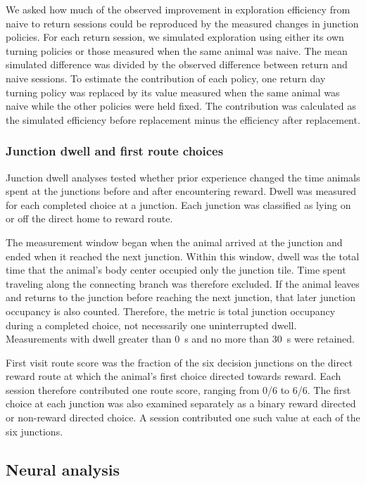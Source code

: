 \documentclass[fleqn,10pt]{wlscirep}
\begin{document}
We asked how much of the observed improvement in exploration efficiency from naive to return sessions could be reproduced by the measured changes in junction policies. For each return session, we simulated exploration using either its own turning policies or those measured when the same animal was naive. The mean simulated difference was divided by the observed difference between return and naive sessions. To estimate the contribution of each policy, one return day turning policy was replaced by its value measured when the same animal was naive while the other policies were held fixed. The contribution was calculated as the simulated efficiency before replacement minus the efficiency after replacement.

\subsubsection*{Junction dwell and first route choices}

Junction dwell analyses tested whether prior experience changed the time animals spent at the junctions before and after encountering reward. Dwell was measured for each completed choice at a junction. Each junction was classified as lying on or off the direct home to reward route.

The measurement window began when the animal arrived at the junction and ended when it reached the next junction. Within this window, dwell was the total time that the animal's body center occupied only the junction tile. Time spent traveling along the connecting branch was therefore excluded. If the animal leaves and returns to the junction before reaching the next junction, that later junction occupancy is also counted. Therefore, the metric is total junction occupancy during a completed choice, not necessarily one uninterrupted dwell. Measurements with dwell greater than 0~s and no more than 30~s were retained.

First visit route score was the fraction of the six decision junctions on the direct reward route at which the animal's first choice directed towards reward. Each session therefore contributed one route score, ranging from 0/6 to 6/6. The first choice at each junction was also examined separately as a binary reward directed or non-reward directed choice. A session contributed one such value at each of the six junctions.

\subsection*{Neural analysis}
\end{document}
